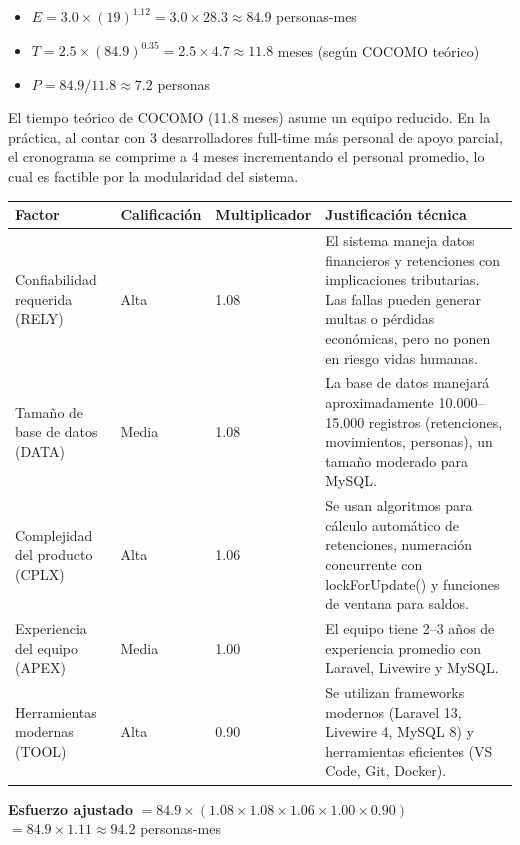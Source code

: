 \documentclass[stu]{apa7}
\begin{document}
\begin{itemize}
    \item $E = 3.0 \times (19)^{1.12} = 3.0 \times 28.3 \approx 84.9$ personas-mes
    \item $T = 2.5 \times (84.9)^{0.35} = 2.5 \times 4.7 \approx 11.8$ meses (según COCOMO teórico)
    \item $P = 84.9 / 11.8 \approx 7.2$ personas
\end{itemize}

El tiempo teórico de COCOMO (11.8 meses) asume un equipo reducido. En la práctica, al contar con 3 desarrolladores full-time más personal de apoyo parcial, el cronograma se comprime a 4 meses incrementando el personal promedio, lo cual es factible por la modularidad del sistema.

\begin{longtable}{|L{4cm}|C{2cm}|C{2.5cm}|L{6cm}|}
\hline
{}
\textbf{Factor} & \textbf{Calificación} & \textbf{Multiplicador} & \textbf{Justificación técnica} \\
\hline
Confiabilidad requerida (RELY) & Alta & 1.08 & El sistema maneja datos financieros y retenciones con implicaciones tributarias. Las fallas pueden generar multas o pérdidas económicas, pero no ponen en riesgo vidas humanas. \\
\hline
Tamaño de base de datos (DATA) & Media & 1.08 & La base de datos manejará aproximadamente 10.000--15.000 registros (retenciones, movimientos, personas), un tamaño moderado para MySQL. \\
\hline
Complejidad del producto (CPLX) & Alta & 1.06 & Se usan algoritmos para cálculo automático de retenciones, numeración concurrente con lockForUpdate() y funciones de ventana para saldos. \\
\hline
Experiencia del equipo (APEX) & Media & 1.00 & El equipo tiene 2--3 años de experiencia promedio con Laravel, Livewire y MySQL. \\
\hline
Herramientas modernas (TOOL) & Alta & 0.90 & Se utilizan frameworks modernos (Laravel 13, Livewire 4, MySQL 8) y herramientas eficientes (VS Code, Git, Docker). \\
\hline
\end{longtable}

\textbf{Esfuerzo ajustado} $= 84.9 \times (1.08 \times 1.08 \times 1.06 \times 1.00 \times 0.90)$ \\
$= 84.9 \times 1.11 \approx 94.2$ personas-mes
\end{document}

